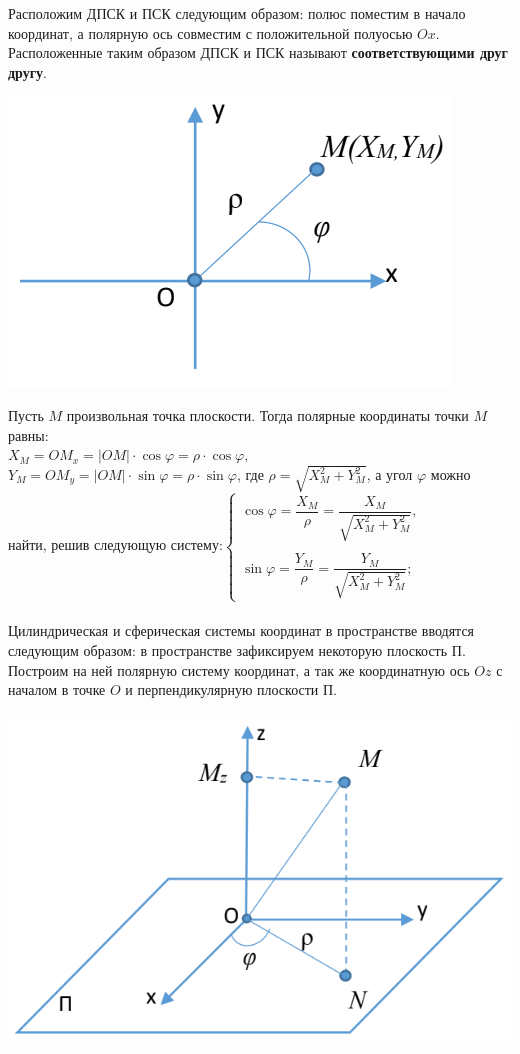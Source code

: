 Расположим ДПСК и ПСК следующим образом: полюс поместим в начало координат, а полярную ось совместим с положительной полуосью $Ox$. Расположенные таким образом ДПСК и ПСК называют \textbf{соответствующими друг другу}.\begin{center}
	\includegraphics[scale=0.4]{images/d_psk.png}
\end{center}
Пусть $M$ произвольная точка плоскости. Тогда полярные координаты точки $M$ равны: \\$X_M = OM_x = |OM|\cdot \cos\varphi = \rho\cdot \cos\varphi,$\\
$Y_M = OM_y = |OM|\cdot \sin\varphi = \rho\cdot \sin\varphi$, где $\rho = \sqrt{X_M^2 + Y_M^2}$, а угол $\varphi$ можно найти, решив следующую систему:$\begin{cases}
	\cos\varphi = \dfrac{X_M}{\rho} = \dfrac{X_M}{\sqrt{X_M^2 + Y_M^2}},\\\\
	\sin\varphi = \dfrac{Y_M}{\rho} = \dfrac{Y_M}{\sqrt{X_M^2 + Y_M^2}};
\end{cases}$\\\\
Цилиндрическая и сферическая системы координат в пространстве вводятся следующим образом: в пространстве зафиксируем некоторую плоскость П. Построим на ней полярную систему координат, а так же координатную ось $Oz$ с началом в точке $O$ и перпендикулярную плоскости П.\begin{center}
	\includegraphics[scale=0.3]{images/pcsk.png}
\end{center}
